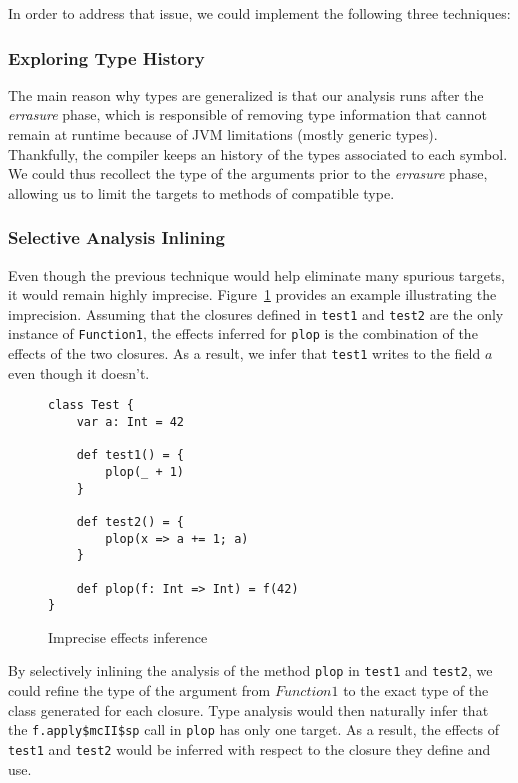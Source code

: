 In order to address that issue, we could implement the following three
techniques:

\subsubsection{Exploring Type History}
The main reason why types are generalized is that our analysis runs
after the \emph{errasure} phase, which is responsible of removing type
information that cannot remain at runtime because of JVM limitations (mostly
generic types). Thankfully, the compiler keeps an history of the types
associated to each symbol. We could thus recollect the type of the arguments
prior to the \emph{errasure} phase, allowing us to limit the targets to methods
of compatible type.

\subsubsection{Selective Analysis Inlining}
Even though the previous technique would help eliminate many spurious targets,
it would remain highly imprecise. Figure~\ref{fig:con:inl} provides an example
illustrating the imprecision. Assuming that the closures defined in
\verb/test1/ and \verb/test2/ are the only instance of \verb/Function1/, the
effects inferred for \verb/plop/ is the combination of the effects of the
two closures. As a result, we infer that \verb/test1/ writes to the field $a$
even though it doesn't.

\begin{figure}[h]
    \centering
\begin{lstlisting}
class Test {
    var a: Int = 42

    def test1() = {
        plop(_ + 1)
    }

    def test2() = {
        plop(x => a += 1; a)
    }

    def plop(f: Int => Int) = f(42)
}
\end{lstlisting}
    \caption{Imprecise effects inference}
    \label{fig:con:inl}
\end{figure}

By selectively inlining the analysis of the method \verb/plop/ in \verb/test1/ and
\verb/test2/, we could refine the type of the argument from $Function1$ to the
exact type of the class generated for each closure. Type analysis would then
naturally infer that the \verb/f.apply$mcII$sp/ call in \verb/plop/ has only
one target.  As a result, the effects of \verb/test1/ and \verb/test2/ would be
inferred with respect to the closure they define and use.

